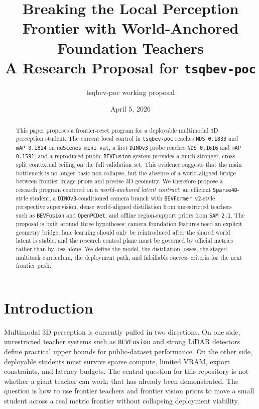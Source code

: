 \documentclass[11pt]{article}
\title{Breaking the Local Perception Frontier with World-Anchored Foundation Teachers\\
\large A Research Proposal for \texttt{tsqbev-poc}}
\author{tsqbev-poc working proposal}
\date{April 5, 2026}
\begin{document}
\maketitle

\begin{abstract}
This paper proposes a frontier-reset program for a deployable multimodal 3D perception student.
The current local control in \texttt{tsqbev-poc} reaches \texttt{NDS 0.1833} and \texttt{mAP 0.1814}
on \texttt{nuScenes mini\_val}; a first \texttt{DINOv3} probe reaches \texttt{NDS 0.1616} and
\texttt{mAP 0.1591}; and a reproduced public \texttt{BEVFusion} system provides a much stronger,
cross-split contextual ceiling on the full validation set. This evidence suggests that the main
bottleneck is no longer basic non-collapse, but the absence of a world-aligned bridge between
frontier image priors and precise 3D geometry. We therefore propose a research program centered on a
\emph{world-anchored latent contract}: an efficient \texttt{Sparse4D}-style student, a
\texttt{DINOv3}-conditioned camera branch with \texttt{BEVFormer v2}-style perspective supervision,
dense world-aligned distillation from unrestricted teachers such as \texttt{BEVFusion} and
\texttt{OpenPCDet}, and offline region-support priors from \texttt{SAM 2.1}. The proposal is built
around three hypotheses: camera foundation features need an explicit geometry bridge, lane learning
should only be reintroduced after the shared world latent is stable, and the research control plane
must be governed by official metrics rather than by loss alone. We define the model, the
distillation losses, the staged multitask curriculum, the deployment path, and falsifiable success
criteria for the next frontier push.
\end{abstract}

\section{Introduction}
Multimodal 3D perception is currently pulled in two directions. On one side, unrestricted teacher
systems such as \texttt{BEVFusion} and strong LiDAR detectors define practical upper bounds for
public-dataset performance. On the other side, deployable students must survive sparse compute,
limited VRAM, export constraints, and latency budgets. The central question for this repository is
not whether a giant teacher can work; that has already been demonstrated. The question is how to
use frontier teachers and frontier vision priors to move a small student across a real metric
frontier without collapsing deployment viability.
\end{document}
